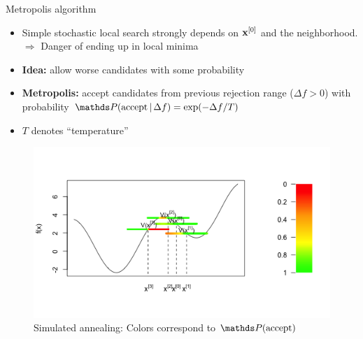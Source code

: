 \documentclass[11pt,compress,t,notes=noshow, xcolor=table]{beamer}
\begin{document}
\begin{vbframe}{Metropolis algorithm}
\begin{itemize}
\item Simple stochastic local search strongly depends on $\mathbf{x}^{[0]}$ and the neighborhood. \\
    $\Rightarrow$ Danger of ending up in local minima
\item \textbf{Idea:} allow worse candidates with some probability
\item \textbf{Metropolis:} accept candidates from previous rejection range ($\Delta f > 0$) with probability $\P(\text{accept} \,|\, \Delta f) = \exp(-\Delta f / T)$
\item $T$ denotes \enquote{temperature}
\end{itemize}

\vspace{-\baselineskip}

\begin{figure}
    \centering
    \includegraphics[height=0.35\textheight,keepaspectratio]{figure_man/metropolis-algorithm.png}
    \caption*{
        \footnotesize
        Simulated annealing: Colors correspond to $\P(\text{accept})$
    }
\end{figure}







\end{vbframe}
\end{document}

